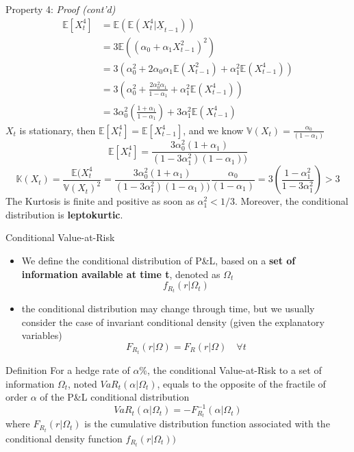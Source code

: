 \documentclass{beamer}
\def\Esp{\mathbb{E}}
\def\Var{\mathbb{V}}
\def\Kurt{\mathbb{K}}
\newcommand{\imfbold}[1]{\textbf{\textcolor{imfblue}{#1}}}
\begin{document}
\begin{frame}{Property 4: \emph{Proof (cont'd) }}
\small
\begin{align*}
   \Esp[X_t^4] &= \Esp(\Esp(X_t^4|\underline{X}_{t-1}))\\ 
               &= 3\Esp( (\alpha_0 +\alpha_1X_{t-1}^2)^2 )\\  
               &= 3\left( \alpha_0^2 + 2\alpha_0\alpha_1\Esp(X_{t-1}^2) +\alpha_1^2\Esp(X_{t-1}^4) \right) \\
               &= 3\left( \alpha_0^2 + \frac{2\alpha_0^2\alpha_1}{1-\alpha_1} +\alpha_1^2\Esp(X_{t-1}^4) \right) \\
               &= 3\alpha_0^2 \left(\frac{1+\alpha_1}{1-\alpha_1} \right) + 3\alpha_1^2\Esp(X_{t-1}^4)
\end{align*}
$X_t$ is stationary, then $\Esp[X_t^4] =\Esp[X_{t-1}^4]$, and we know $\Var(X_t) = \frac{\alpha_0}{(1-\alpha_1)}$
$$ \Esp[X_t^4] =\frac{3\alpha_0^2(1+\alpha_1)}{(1-3\alpha_1^2)(1-\alpha_1) )}$$
$$\Kurt(X_t) = \frac{\Esp(X_t^4}{\Var(X_t)^2} = \frac{3\alpha_0^2(1+\alpha_1)}{(1-3\alpha_1^2)(1-\alpha_1) )} \frac{\alpha_0}{(1-\alpha_1)} = 3 \left( \frac{1-\alpha_1^2}{1-3\alpha_1^2} \right) > 3$$
The Kurtosis is finite and positive as soon as $\alpha_1^2<1/3$. Moreover, the conditional distribution is \imfbold{leptokurtic}.
\end{frame}

\begin{frame}{Conditional Value-at-Risk}
\small
\begin{itemize}
    \item We define the conditional distribution of P\&L, based on a \textbf{set of information available at time t}, denoted as $\Omega_t$
     $$f_{R_t}(r|\Omega_t)$$
     \item the conditional distribution may change through time, but we usually consider the case of invariant conditional density (given the explanatory variables)
     $$F_{R_t}(r|\Omega) = F_{R}(r|\Omega) \quad \forall t$$
\end{itemize}  
\begin{block}{Definition}
    For a hedge rate of $\alpha$\%, the conditional Value-at-Risk to a set of information $\Omega_t$, noted $VaR_t (\alpha|\Omega_t)$, equals to the opposite of the fractile of order $\alpha$ of the P\&L conditional distribution
    $$VaR_t(\alpha|\Omega_t) = -F^{-1}_{R_t}(\alpha|\Omega_t)$$
    where $F_{R_t}(r|\Omega_t)$ is the cumulative distribution function associated with the conditional density function $f_{R_t}(r|\Omega_t))$
\end{block}
\end{frame}
\end{document}
